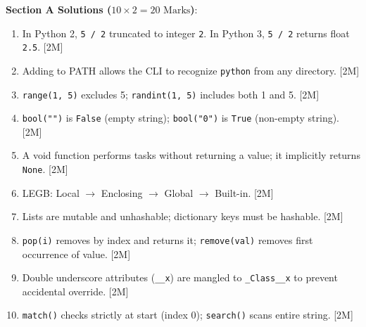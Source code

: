 \begin{solutionbox}
\noindent\textbf{Section A Solutions ($10 \times 2 = 20\text{ Marks}$)}:
\begin{enumerate}
    \item In Python 2, \texttt{5 / 2} truncated to integer \texttt{2}. In Python 3, \texttt{5 / 2} returns float \texttt{2.5}. [2M]
    \item Adding to PATH allows the CLI to recognize \texttt{python} from any directory. [2M]
    \item \texttt{range(1, 5)} excludes 5; \texttt{randint(1, 5)} includes both 1 and 5. [2M]
    \item \texttt{bool("")} is \texttt{False} (empty string); \texttt{bool("0")} is \texttt{True} (non-empty string). [2M]
    \item A void function performs tasks without returning a value; it implicitly returns \texttt{None}. [2M]
    \item LEGB: Local $\to$ Enclosing $\to$ Global $\to$ Built-in. [2M]
    \item Lists are mutable and unhashable; dictionary keys must be hashable. [2M]
    \item \texttt{pop(i)} removes by index and returns it; \texttt{remove(val)} removes first occurrence of value. [2M]
    \item Double underscore attributes (\texttt{\_\_x}) are mangled to \texttt{\_Class\_\_x} to prevent accidental override. [2M]
    \item \texttt{match()} checks strictly at start (index 0); \texttt{search()} scans entire string. [2M]
\end{enumerate}


\end{solutionbox}
